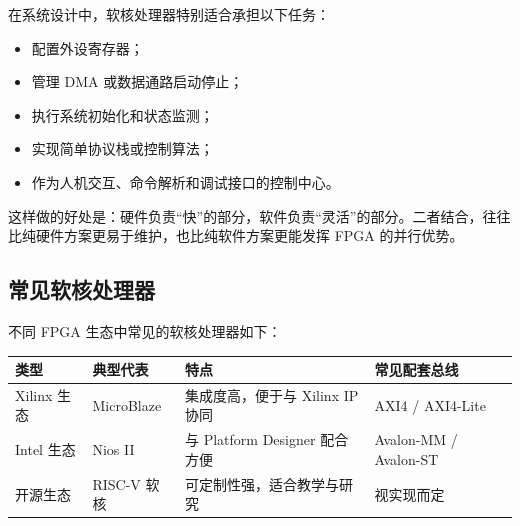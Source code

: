 在系统设计中，软核处理器特别适合承担以下任务：

\begin{itemize}
\tightlist
\item
  配置外设寄存器；
\item
  管理 DMA 或数据通路启动停止；
\item
  执行系统初始化和状态监测；
\item
  实现简单协议栈或控制算法；
\item
  作为人机交互、命令解析和调试接口的控制中心。
\end{itemize}

这样做的好处是：硬件负责``快''的部分，软件负责``灵活''的部分。二者结合，往往比纯硬件方案更易于维护，也比纯软件方案更能发挥
FPGA 的并行优势。

\subsection{常见软核处理器}\label{ux5e38ux89c1ux8f6fux6838ux5904ux7406ux5668}

不同 FPGA 生态中常见的软核处理器如下：

\begin{longtable}[]{@{}
  >{\raggedright\arraybackslash}p{}
  >{\raggedright\arraybackslash}p{}
  >{\raggedright\arraybackslash}p{}
  >{\raggedright\arraybackslash}p{}@{}}
\toprule\noalign{}
\begin{minipage}[b]{\linewidth}\raggedright
类型
\end{minipage} & \begin{minipage}[b]{\linewidth}\raggedright
典型代表
\end{minipage} & \begin{minipage}[b]{\linewidth}\raggedright
特点
\end{minipage} & \begin{minipage}[b]{\linewidth}\raggedright
常见配套总线
\end{minipage} \\
\midrule\noalign{}
\endhead
\bottomrule\noalign{}
\endlastfoot
Xilinx 生态 & MicroBlaze & 集成度高，便于与 Xilinx IP 协同 & AXI4 /
AXI4-Lite \\
Intel 生态 & Nios II & 与 Platform Designer 配合方便 & Avalon-MM /
Avalon-ST \\
开源生态 & RISC-V 软核 & 可定制性强，适合教学与研究 & 视实现而定 \\
\end{longtable}

